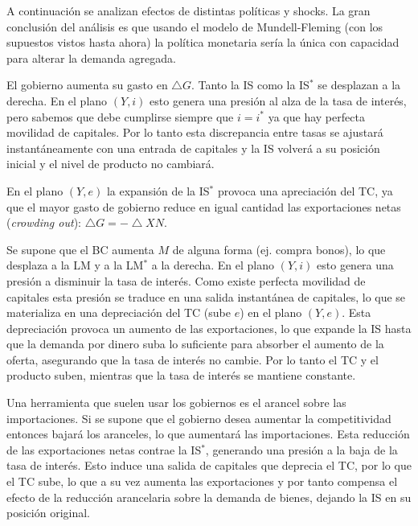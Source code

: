 \documentclass[DeGregorioResumen]{subfiles}
\begin{document}
A continuación se analizan efectos de distintas políticas y shocks. La gran conclusión del análisis es que usando el modelo de Mundell-Fleming (con los supuestos vistos hasta ahora) la política monetaria sería la única con capacidad para alterar la demanda agregada.


El gobierno aumenta su gasto en $\bigtriangleup G$. Tanto la IS como la IS$^*$ se desplazan a la derecha. En el plano $(Y, i)$ esto genera una presión al alza de la tasa de interés, pero sabemos que debe cumplirse siempre que $i=i^*$ ya que hay perfecta movilidad de capitales. Por lo tanto esta discrepancia entre tasas se ajustará instantáneamente con una entrada de capitales y la IS volverá a su posición inicial y el nivel de producto no cambiará.

En el plano $(Y, e)$ la expansión de la IS$^*$ provoca una apreciación del TC, ya que el mayor gasto de gobierno reduce en igual cantidad las exportaciones netas (\textit{crowding out}): $\bigtriangleup G = -\bigtriangleup XN$.


Se supone que el BC aumenta $M$ de alguna forma (ej. compra bonos), lo que desplaza a la LM y a la LM$^*$ a la derecha. En el plano $(Y, i)$ esto genera una presión a disminuir la tasa de interés. Como existe perfecta movilidad de capitales esta presión se traduce en una salida instantánea de capitales, lo que se materializa en una depreciación del TC (sube $e$) en el plano $(Y, e)$. Esta depreciación provoca un aumento de las exportaciones, lo que expande la IS hasta que la demanda por dinero suba lo suficiente para absorber el aumento de la oferta, asegurando que la tasa de interés no cambie. Por lo tanto el TC y el producto suben, mientras que la tasa de interés se mantiene constante.


Una herramienta que suelen usar los gobiernos es el arancel sobre las importaciones. Si se supone que el gobierno desea aumentar la competitividad entonces bajará los aranceles, lo que aumentará las importaciones. Esta reducción de las exportaciones netas contrae la IS$^*$, generando una presión a la baja de la tasa de interés. Esto induce una salida de capitales que deprecia el TC, por lo que el TC sube, lo que a su vez aumenta las exportaciones y por tanto compensa el efecto de la reducción arancelaria sobre la demanda de bienes, dejando la IS en su posición original.
\end{document}
